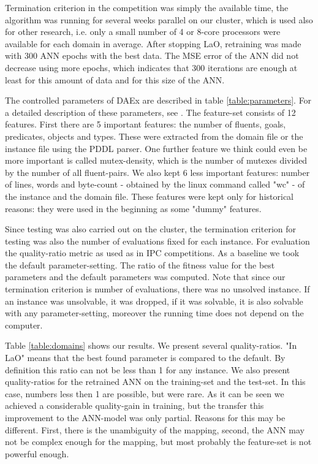 \documentclass{acm_proc_article-sp}
\begin{document}
Termination criterion in the competition was simply the available time, the algorithm was running for several weeks parallel on our cluster, which is used also for other research, i.e. only a small number of 4 or 8-core processors were available for each domain in average. After stopping LaO, retraining was made with 300 ANN epochs with the best data. The MSE error of the ANN did not decrease using more epochs, which indicates that 300 iterations are enough at least for this amount of data and for this size of the ANN.

The controlled parameters of DAEx are described in table \ref{table:parameters}. For a detailed description of these parameters, see \cite{BibGECCO:2010}. The feature-set consists of 12 features. First there are 5 important features: the number of fluents, goals, predicates, objects and types. These were extracted from the domain file or the instance file using the PDDL parser. One further feature we think could even be more important is called mutex-density, which is the number of mutexes divided by the number of all fluent-pairs. We also kept 6 less important features: number of lines, words and byte-count - obtained by the linux command called "wc" - of the instance and the domain file. These features were kept only for historical reasons: they were used in the beginning as some "dummy" features.

Since testing was also carried out on the cluster, the termination criterion for testing was also the number of evaluations fixed for each instance. For evaluation the quality-ratio metric as used as in IPC competitions. As a baseline we took the default parameter-setting. The ratio of the fitness value for the best parameters and the default parameters was computed. Note that since our termination criterion is number of evaluations, there was no unsolved instance. If an instance was unsolvable, it was dropped, if it was solvable, it is also solvable with any parameter-setting, moreover the running time does not depend on the computer. 

Table \ref{table:domains} shows our results. We present several quality-ratios. "In LaO" means that the best found parameter is compared to the default. By definition this ratio can not be less than 1 for any instance. We also present quality-ratios for the retrained ANN on the training-set and the test-set. In this case, numbers less then 1 are possible, but were rare. As it can be seen we achieved a considerable quality-gain in training, but the transfer this improvement to the ANN-model was only partial. Reasons for this may be different. First, there is the unambiguity of the mapping, second, the ANN may not be complex enough for the mapping, but most probably the feature-set is not powerful enough. 
\end{document}

